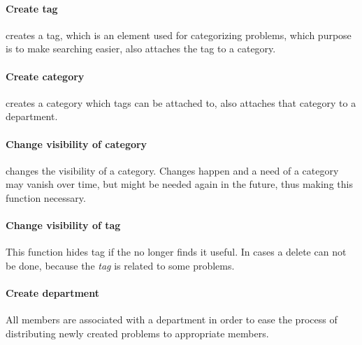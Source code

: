 \paragraph{Create tag} creates a tag, which is an element used for categorizing problems, which purpose is to make searching easier, also attaches the tag to a category. 

\paragraph{Create category} creates a category which tags can be attached to, also attaches that category to a department. 

\paragraph{Change visibility of category} changes the visibility of a category. Changes happen and a need of a category may vanish over time, but might be needed again in the future, thus making this function necessary. 

\paragraph{Change visibility of tag} This function hides tag if the \sadmin{} no longer finds it useful. In cases a delete can not be done, because the \textit{tag} is related to some problems. 




\paragraph{Create department} All \astaff[] members are associated with a department in order to ease the process of distributing newly created problems to appropriate \astaff[] members. 

